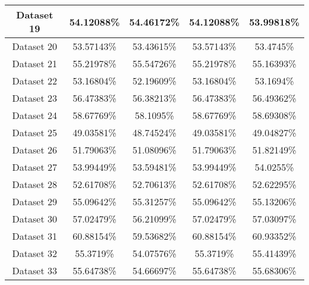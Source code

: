 \begin{table}
\begin{tabular}{ |c||c|c|c|c| }
    \hline
    Dataset 19& 54.12088\%& 54.46172\%& 54.12088\%& 53.99818\%\\
    \hline
    Dataset 20& 53.57143\%& 53.43615\%& 53.57143\%& 53.4745\%\\
    \hline
    Dataset 21& 55.21978\%& 55.54726\%& 55.21978\%& 55.16393\%\\
    \hline
    Dataset 22& 53.16804\%& 52.19609\%& 53.16804\%& 53.1694\%\\
    \hline
    Dataset 23& 56.47383\%& 56.38213\%& 56.47383\%& 56.49362\%\\
    \hline
    Dataset 24& 58.67769\%& 58.1095\%& 58.67769\%& 58.69308\%\\
    \hline
    Dataset 25& 49.03581\%& 48.74524\%& 49.03581\%& 49.04827\%\\
    \hline
    Dataset 26& 51.79063\%& 51.08096\%& 51.79063\%& 51.82149\%\\
    \hline
    Dataset 27& 53.99449\%& 53.59481\%& 53.99449\%& 54.0255\%\\
    \hline
    Dataset 28& 52.61708\%& 52.70613\%& 52.61708\%& 52.62295\%\\
    \hline
    Dataset 29& 55.09642\%& 55.31257\%& 55.09642\%& 55.13206\%\\
    \hline
    Dataset 30& 57.02479\%& 56.21099\%& 57.02479\%& 57.03097\%\\
    \hline
    Dataset 31& 60.88154\%& 59.53682\%& 60.88154\%& 60.93352\%\\
    \hline
    Dataset 32& 55.3719\%& 54.07576\%& 55.3719\%& 55.41439\%\\
    \hline
    Dataset 33& 55.64738\%& 54.66697\%& 55.64738\%& 55.68306\%\\
    \hline
\end{tabular}
\end{table}

\newpage

